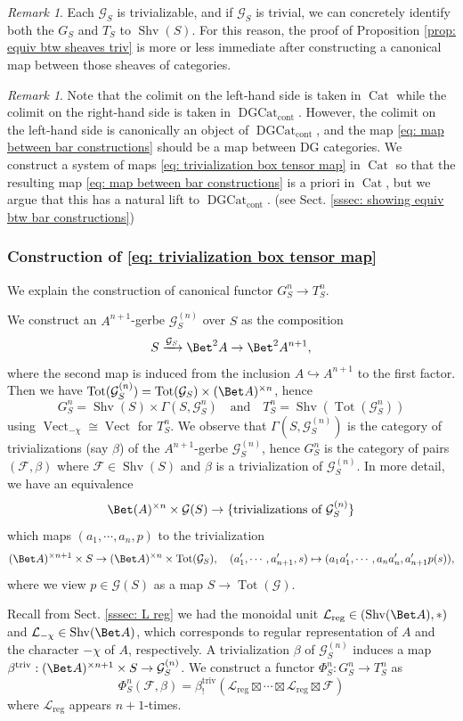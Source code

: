 \documentclass[10pt]{amsart}
\newcommand{\sssec}{\subsubsection}
\theoremstyle{remark}
\newtheorem{rmk}[subsubsection]{Remark}
\newcommand{\te}{\text}
\newcommand{\on}{\operatorname}
\newcommand{\cF}{\mathcal{F}}
\newcommand{\cG}{\mathcal{G}}
\newcommand{\cL}{\mathcal{L}}
\newcommand{\Cat}{\on{Cat}}
\newcommand{\DGcat}{\on{DGCat}_{\on{cont}}}
\newcommand{\Vect}{\on{Vect}}
\newcommand{\Shv}{\on{Shv}}
\begin{document}
\begin{rmk}
    Each $\cG_S$ is trivializable, and if $\cG_S$ is trivial, we can concretely identify both the $G_S$ and $T_S$ to $\Shv(S)$. For this reason, the proof of Proposition \ref{prop: equiv btw sheaves triv} is more or less immediate after constructing a canonical map between those sheaves of categories.
\end{rmk}

\begin{rmk}
    Note that the colimit on the left-hand side is taken in $\Cat$ while the colimit on the right-hand side is taken in $\DGcat$. However, the colimit on the left-hand side is canonically an object of $\DGcat$, and the map \eqref{eq: map between bar constructions} should be a map between DG categories. We construct a system of maps \eqref{eq: trivialization box tensor map} in $\Cat$ so that the resulting map \eqref{eq: map between bar constructions} is a priori in $\Cat$, but we argue that this has a natural lift to $\DGcat$. (see Sect. \ref{sssec: showing equiv btw bar constructions})
\end{rmk}



\sssec{Construction of \eqref{eq: trivialization box tensor map}} 
We explain the construction of canonical functor $G^n_S\rightarrow T^n_S$. 
\medskip

We construct an $A^{n+1}$-gerbe $\cG^{(n)}_S$ over $S$ as the composition
\[S\xrightarrow{\cG_S} \Bet^2 A\rightarrow \Bet^2 A^{n+1},\]
where the second map is induced from the inclusion $A\hookrightarrow A^{n+1}$ to the first factor. Then we have $\on{Tot}(\cG^{(n)}_S)= \on{Tot}(\cG_S)\times (\Bet A)^{\times n}$, hence
\[G^n_S=\Shv(S)\times \Gamma(S,\cG^n_S) \quad \te{and}\quad T^n_S= \Shv(\on{Tot}(\cG^n_S))\]
using $\Vect_{-\chi}\cong\Vect$ for $T^n_S$.
We observe that $\Gamma(S,\cG^{(n)}_S)$ is the category of trivializations (say $\beta$)  of the $A^{n+1}$-gerbe $\cG^{(n)}_S$, hence $G^n_S$ is the category of pairs $(\cF,\beta)$ where $\cF\in\Shv(S)$ and $\beta$ is a trivialization of $\cG^{(n)}_S$. In more detail, we have an equivalence
\[\Bet(A)^{\times n}\times\cG(S)\rightarrow \{\te{trivializations of } \cG^{(n)}_S\}\]
which maps $(a_1,\cdots,a_n,p)$ to the trivialization
\[(\Bet A)^{\times n+1}\times S\rightarrow (\Bet A)^{\times n}\times\on{Tot}(\cG_S),\quad (a'_1,\cdots,a'_{n+1},s)\mapsto (a_1 a'_1,\cdots, a_n a'_n, a'_{n+1} p(s)),\]
where we view $p\in\cG(S)$ as a map $S\rightarrow \on{Tot}(\cG)$.
\medskip

Recall from Sect. \ref{sssec: L reg} we had the monoidal unit $\cL_{\on{reg}}\in (\Shv(\Bet A),\ast)$ and $\cL_{-\chi}\in \Shv(\Bet A)$, which corresponds to regular representation of $A$ and the character $-\chi$ of $A$, respectively. A trivialization $\beta$ of $\cG^{(n)}_S$ induces a map $\beta^{\on{triv}}: (\Bet A)^{\times n+1}\times S\rightarrow \cG^{(n)}_S$. We construct a functor $\Phi^n_S:G^n_S\rightarrow T^n_S$ as
\begin{equation*}
    \Phi^n_S(\cF,\beta)=\beta^{\on{triv}}_!(\cL_{\on{reg}}\boxtimes\cdots\boxtimes\cL_{\on{reg}}\boxtimes \cF)
\end{equation*}
where $\cL_{\on{reg}}$ appears $n+1$-times.
\end{document}
